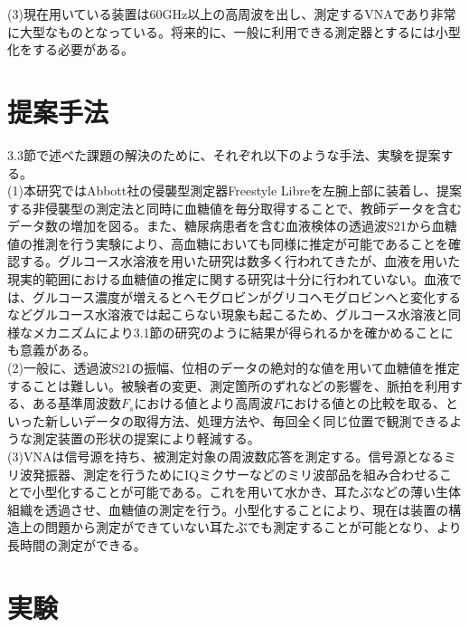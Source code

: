 \documentclass[11pt,a4paper,uplatex,draft]{ujarticle}
\begin{document}
(3)現在用いている装置は60GHz以上の高周波を出し、測定するVNAであり非常に大型なものとなっている。将来的に、一般に利用できる測定器とするには小型化をする必要がある。

\section{提案手法}
3.3節で述べた課題の解決のために、それぞれ以下のような手法、実験を提案する。\\

(1)本研究ではAbbott社の侵襲型測定器Freestyle Libreを左腕上部に装着し、提案する非侵襲型の測定法と同時に血糖値を毎分取得することで、教師データを含むデータ数の増加を図る。また、糖尿病患者を含む血液検体の透過波S21から血糖値の推測を行う実験により、高血糖においても同様に推定が可能であることを確認する。グルコース水溶液を用いた研究は数多く行われてきたが、血液を用いた現実的範囲における血糖値の推定に関する研究は十分に行われていない。血液では、グルコース濃度が増えるとヘモグロビンがグリコヘモグロビンへと変化するなどグルコース水溶液では起こらない現象も起こるため、グルコース水溶液と同様なメカニズムにより3.1節の研究のように結果が得られるかを確かめることにも意義がある。\\

(2)一般に、透過波S21の振幅、位相のデータの絶対的な値を用いて血糖値を推定することは難しい。被験者の変更、測定箇所のずれなどの影響を、脈拍を利用する、ある基準周波数$F_{s}$における値とより高周波$F$における値との比較を取る、といった新しいデータの取得方法、処理方法や、毎回全く同じ位置で観測できるような測定装置の形状の提案により軽減する。\\

(3)VNAは信号源を持ち、被測定対象の周波数応答を測定する。信号源となるミリ波発振器、測定を行うためにIQミクサーなどのミリ波部品を組み合わせることで小型化することが可能である。これを用いて水かき、耳たぶなどの薄い生体組織を透過させ、血糖値の測定を行う。小型化することにより、現在は装置の構造上の問題から測定ができていない耳たぶでも測定することが可能となり、より長時間の測定ができる。

\newpage
\section{実験}
\end{document}
